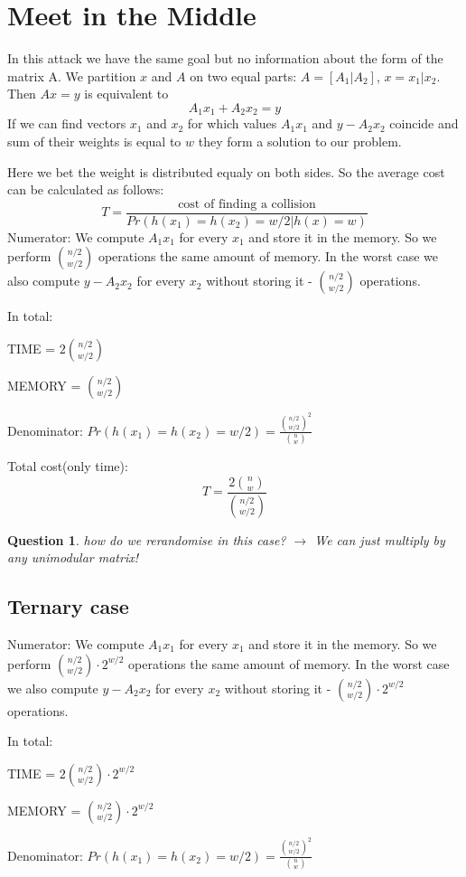 \documentclass[12pt]{article}
\newtheorem{question}{Question}
\begin{document}
\section{Meet in the Middle}
In this attack we have the same goal but no information about the form of the matrix A.
We partition $x$ and $A$ on two equal parts: $A = [A_1 | A_2]$, $x = x_1 | x_2$.
Then $Ax = y$ is equivalent to
\[
    A_1x_1 + A_2x_2 = y
\]
If we can find vectors $x_1$ and $x_2$ for which values $A_1x_1$ and $y - A_2x_2$ coincide
and sum of their weights is equal to $w$ they form a solution to our problem.

Here we bet the weight is distributed equaly on both sides. So the average cost can be calculated as follows:
\[
  T = \frac{\text{cost of finding a collision}}{Pr(h(x_1) = h(x_2) = w/2| h(x) =w)}
\]
Numerator:
We compute $A_1x_1$ for every $x_1$ and store it in the memory. So we perform $\binom{n/2}{w/2}$ operations the same amount of memory. In the worst case we also compute $y - A_2x_2$ for every $x_2$ without storing it - $\binom{n/2}{w/2}$ operations.

In total:

TIME = $2\binom{n/2}{w/2}$

MEMORY = $\binom{n/2}{w/2}$

Denominator:
$Pr(h(x_1) = h(x_2) = w/2) = \frac{\binom{n/2}{w/2}^{2}}{\binom{n}{w}}$

Total cost(only time):
\[
  T = \frac{2\binom{n}{w}}{\binom{n/2}{w/2}}
\]

\begin{question}
  how do we rerandomise in this case? $\rightarrow$ We can just multiply by any unimodular matrix!
\end{question}

\subsection{Ternary case}
Numerator:
We compute $A_1x_1$ for every $x_1$ and store it in the memory. So we perform $\binom{n/2}{w/2} \cdot 2^{w/2}$ operations the same amount of memory. In the worst case we also compute $y - A_2x_2$ for every $x_2$ without storing it - $\binom{n/2}{w/2} \cdot 2^{w/2}$ operations.

In total:

TIME = $2\binom{n/2}{w/2} \cdot 2^{w/2}$

MEMORY = $\binom{n/2}{w/2} \cdot 2^{w/2}$

Denominator:
$Pr(h(x_1) = h(x_2) = w/2) = \frac{\binom{n/2}{w/2}^{2}}{\binom{n}{w}}$
\end{document}
